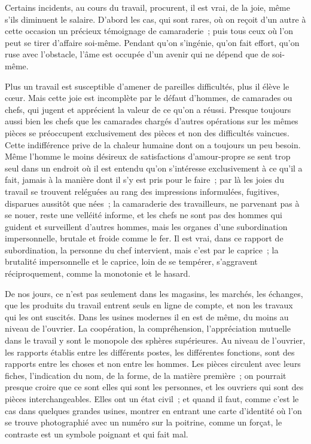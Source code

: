 \documentclass[french,twoside]{book} %
\begin{document}
Certains incidents, au cours du travail, procurent, il est vrai, de la joie, même s'ils diminuent le salaire. D’abord les cas, qui sont rares, où on reçoit d'un autre à cette occasion un précieux témoignage de camaraderie ; puis tous ceux où l'on peut se tirer d'affaire soi-même. Pendant qu'on s'ingénie, qu'on fait effort, qu'on ruse avec l'obstacle, l'âme est occupée d'un avenir qui ne dépend que de soi-même.\par
Plus un travail est susceptible d'amener de pareilles difficultés, plus il élève le cœur. Mais cette joie est incomplète par le défaut d'hommes, de camarades ou chefs, qui jugent et apprécient la valeur de ce qu'on a réussi. Presque toujours aussi bien les chefs que les camarades chargés d'autres opérations sur les mêmes pièces se préoccupent exclusivement des pièces et non des difficultés vaincues. Cette indifférence prive de la chaleur humaine dont on a toujours un peu besoin. Même l'homme le moins désireux de satisfactions d'amour-propre se sent trop seul dans un endroit où il est entendu qu'on s'intéresse exclusivement à ce qu'il a fait, jamais à la manière dont il s'y est pris pour le faire ; par là les joies du travail se trouvent reléguées au rang des impressions informulées, fugitives, disparues aussitôt que nées ; la camaraderie des travailleurs, ne parvenant pas à se nouer, reste une velléité informe, et les chefs ne sont pas des hommes qui guident et surveillent d'autres hommes, mais les organes d'une subordination impersonnelle, brutale et froide comme le fer. Il est vrai, dans ce rapport de subordination, la personne du chef intervient, mais c'est par le caprice ; la brutalité impersonnelle et le caprice, loin de se tempérer, s'aggravent réciproquement, comme la monotonie et le hasard.\par
\par
De nos jours, ce n'est pas seulement dans les magasins, les marchés, les échanges, que les produits du travail entrent seuls en ligne de compte, et non les travaux qui les ont suscités. Dans les usines modernes il en est de même, du moins au niveau de l'ouvrier. La coopération, la compréhension, l'appréciation mutuelle dans le travail y sont le monopole des sphères supérieures. Au niveau de l'ouvrier, les rapports établis entre les différents postes, les différentes fonctions, sont des rapports entre les choses et non entre les hommes. Les pièces circulent avec leurs fiches, l'indication du nom, de la forme, de la matière première ; on pourrait presque croire que ce sont elles qui sont les personnes, et les ouvriers qui sont des pièces interchangeables. Elles ont un état civil ; et quand il faut, comme c'est le cas dans quelques grandes usines, montrer en entrant une carte d'identité où l'on se trouve photographié avec un numéro sur la poitrine, comme un forçat, le contraste est un symbole poignant et qui fait mal.\par
\end{document}
